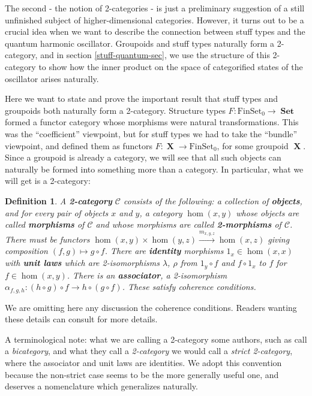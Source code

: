 \documentclass{amsart} \usepackage{amsmath,amssymb,bbm}
\newcommand{\opname}[1]{\operatorname{#1}}
\newtheorem{definition}{Definition}
\newcommand{\catname}[1]{\boldsymbol{\opname{{#1}}}}
\newcommand{\FSN}{\catname{FinSet_0}}
\newcommand{\Set}{\catname{Set}}
\newcommand{\longrightarrowlim}{\mathop{\longrightarrow}\limits}
\begin{document}
The second - the notion of 2-categories - is just a preliminary suggestion of
a still unfinished subject of higher-dimensional categories.  However, it
turns out to be a crucial idea when we want to describe the connection between
stuff types and the quantum harmonic oscillator.  Groupoids and stuff types
naturally form a 2-category, and in section \ref{stuff-quantum-sec}, we use
the structure of this 2-category to show how the inner product on the space of
categorified states of the oscillator arises naturally.

Here we want to state and prove the important result that stuff types
and groupoids both naturally form a 2-category.  Structure types $F :
\FSN \rightarrow \Set$ formed a functor category whose morphisms were
natural transformations.  This was the ``coefficient'' viewpoint, but
for stuff types we had to take the ``bundle'' viewpoint, and defined
them as functors $F : \catname{X} \rightarrow \FSN$, for some groupoid
$\catname{X}$.  Since a groupoid is already a category, we will see
that all such objects can naturally be formed into something more than
a category.  In particular, what we will get is a 2-category:

\begin{definition}
  A {\textbf{2-category}} $\mathcal{C}$ consists of the following: a
  collection of {\textbf{objects}}, and for every pair of objects $x$
  and $y$, a category $\hom ( x, y )$ whose objects are called
  {\textbf{morphisms}} of $\mathcal{C}$ and whose morphisms are called
  {\textbf{2-morphisms}} of $\mathcal{C}$.  There must be functors
  $\hom ( x, y ) \times \hom ( y, z ) \longrightarrowlim^{m_{x, y, z}}
  \hom ( x, z )$ giving composition $( f, g ) \mapsto g \circ f$.
  There are {\textbf{identity}} morphisms $1_x \in \hom ( x, x )$ with
  {\textbf{unit laws}} which are 2-isomorphisms $\lambda$, $\rho$ from
  $1_y \circ f$ and $f \circ 1_x$ to $f$ for $f \in \hom ( x, y )$.
  There is an {\textbf{associator}}, a 2-isomorphism $\alpha_{f, g, h}
  : ( h \circ g ) \circ f \rightarrow h \circ ( g \circ f )$.  These
  satisfy coherence conditions.
\end{definition}

We are omitting here any discussion the coherence conditions.  Readers
wanting these details can consult {\cite{maclane}} for more details.

A terminological note: what we are calling a 2-category some authors,
such as {\cite{figamhy}} call a {\textit{bicategory}}, and what they call
a {\textit{2-category}} we would call a {\textit{strict 2-category}}, where
the associator and unit laws are identities.  We adopt this convention
because the non-strict case seems to be the more generally useful one,
and deserves a nomenclature which generalizes naturally.
\end{document}
